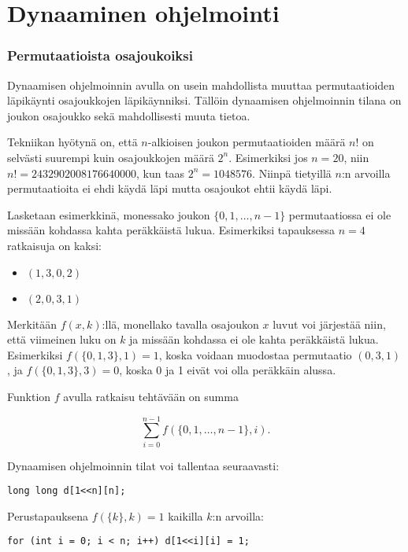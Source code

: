 \section{Dynaaminen ohjelmointi}

\subsubsection{Permutaatioista osajoukoiksi}

Dynaamisen ohjelmoinnin avulla on usein mahdollista
muuttaa permutaatioiden läpikäynti osajoukkojen läpikäynniksi.
Tällöin dynaamisen ohjelmoinnin tilana on
joukon osajoukko sekä mahdollisesti muuta tietoa.

Tekniikan hyötynä on,
että $n$-alkioisen joukon permutaatioiden määrä $n!$
on selvästi suurempi kuin osajoukkojen määrä $2^n$.
Esimerkiksi jos $n=20$, niin $n!=2432902008176640000$,
kun taas $2^n=1048576$.
Niinpä tietyillä $n$:n arvoilla permutaatioita ei ehdi
käydä läpi mutta osajoukot ehtii käydä läpi.

Lasketaan esimerkkinä, monessako
joukon $\{0,1,\ldots,n-1\}$
permutaatiossa ei ole 
missään kohdassa kahta peräkkäistä lukua.
Esimerkiksi tapauksessa $n=4$ ratkaisuja on kaksi:
\begin{itemize}
\item $(1,3,0,2)$
\item $(2,0,3,1)$
\end{itemize}

Merkitään $f(x,k)$:llä,
monellako tavalla osajoukon
$x$ luvut voi järjestää niin,
että viimeinen luku on $k$ ja missään kohdassa
ei ole kahta peräkkäistä lukua.
Esimerkiksi $f(\{0,1,3\},1)=1$,
koska voidaan muodostaa permutaatio $(0,3,1)$,
ja $f(\{0,1,3\},3)=0$, koska 0 ja 1 eivät
voi olla peräkkäin alussa.

Funktion $f$ avulla ratkaisu tehtävään
on summa

\[ \sum_{i=0}^{n-1} f(\{0,1,\ldots,n-1\},i). \]

\noindent
Dynaamisen ohjelmoinnin tilat voi
tallentaa seuraavasti:

\begin{lstlisting}
long long d[1<<n][n];
\end{lstlisting}

\noindent
Perustapauksena $f(\{k\},k)=1$ kaikilla $k$:n arvoilla:

\begin{lstlisting}
for (int i = 0; i < n; i++) d[1<<i][i] = 1;
\end{lstlisting}

